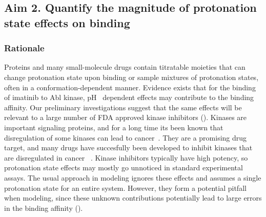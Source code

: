 \documentclass[10pt,final]{article}
\newcommand{\pH}{p$\mathrm{H}$\ }
\begin{document}
\subsection*{Aim 2. Quantify the magnitude of protonation state effects on binding}
\subsubsection*{Rationale}
Proteins and many small-molecule drugs contain titratable moieties that can change protonation state upon binding or sample mixtures of protonation states, often in a conformation-dependent manner.
%
Evidence exists that for the binding of imatinib to Abl kinase, \pH{} dependent effects may contribute to the binding affinity\cite{Szakacs2005a, Seeliger2007a, Lin2013a}. 
%
Our preliminary investigations suggest that the same effects will be relevant to a large number of FDA approved kinase inhibitors ().
%
Kinases are important signaling proteins, and for a long time its been known that disregulation of some kinases can lead to cancer~\autocite{Levinson1978a,Vivanco2002a}.
%
They are a promising drug target, and many drugs have succesfully been developed to inhibit kinases that are disregulated in cancer ~\autocite{Baselga2006a,Garber2006a,OHare2011a}.
%
Kinase inhibitors typically have high potency, so protonation state effects may mostly go unnoticed in standard experimental assays.
%
The usual approach in modeling ignores these effects and assumes a single protonation state for an entire system.
%
However, they form a potential pitfall when modeling, since these unknown contributions potentially lead to large errors in the binding affinity ().
\end{document}
